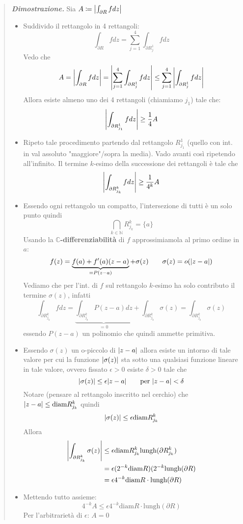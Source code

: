 \documentclass[a4paper,10pt]{article}
\newcommand{\na}{\mathbb{N}} %
\newcommand{\im}{\mathbb{C}} %
\theoremstyle{indentdefinition}
\theoremstyle{indenttheorem}
\theoremstyle{myremark}
\theoremstyle{indentgeneral}
\newenvironment{dimo}{\begin{quote}\textit{\textbf{Dimostrazione.}}}{\end{quote}} %
\begin{document}
\begin{dimo}
    Sia $A\coloneqq\abs{\int_{\partial R}fdz}$
    \begin{itemize}
        \item Suddivido il rettangolo in 4 rettangoli:
        $$\int_{\partial R}fdz=\sum_{j=1}^4\int_{\partial R_j^1}fdz$$
        Vedo che
        $$A=\abs{\int_{\partial R}fdz}=\abs{\sum_{j=1}^4\int_{\partial R_j^1}fdz}\le\sum_{j=1}^4\abs{\int_{\partial R_j^1}fdz}$$
        Allora esiste almeno uno dei 4 rettangoli (chiamiamo $j_1$) tale che:
        $$\abs{\int_{\partial R_{j_1}^1}fdz}\ge \frac{1}{4}A$$
        \item Ripeto tale procedimento partendo dal rettangolo $R_{j_1}^1$ (quello con int. in val assoluto "maggiore"/sopra la media). Vado avanti così ripetendo all'infinito. Il termine $k$-esimo della successione dei rettangoli è tale che 
        $$\abs{\int_{\partial R_{j_k}^k}fdz}\ge \frac{1}{4^k}A$$
        \item Essendo ogni rettangolo un compatto, l'intersezione di tutti è un solo punto quindi
        $$\bigcap_{k\in\na}R_{j_k}^k=\{a\}$$
        Usando la $\im$\textbf{-differenziabilità} di $f$ approssimiamola al primo ordine in $a$: 
        $$f(z)=\underbrace{f(a)+f'(a)(z-a)}_{=P(z-a)}+\sigma(z) \quad \quad \sigma(z)=o(\abs{z-a})$$
        Vediamo che per l'int. di $f$ sul rettangolo $k$-esimo ha solo contributo il termine $\sigma(z)$, infatti
        $$\int_{\partial R_{j_k}^k}fdz=\underbrace{\int_{\partial R_{j_k}^k}P(z-a)dz}_{=0}+\int_{\partial R_{j_k}^k}\sigma(z)=\int_{\partial R_{j_k}^k}\sigma(z)$$
        essendo $P(z-a)$ un polinomio che quindi ammette primitiva.
        \item Essendo $\sigma(z)$ un o-piccolo di $\abs{z-a}$ allora esiste un intorno di tale valore per cui la funzione $\abs{\sigma(z)}$ sta sotto una qualsiasi funzione lineare in tale valore, ovvero fissato $\epsilon>0$ esiste $\delta>0$ tale che
        $$\abs{\sigma(z)}\le\epsilon\abs{z-a} \quad\quad \text{per $\abs{z-a}<\delta$}$$
        Notare (pensare al rettangolo inscritto nel cerchio) che $\abs{z-a}\le\text{diam}R_{j_k}^k$ quindi
        $$\abs{\sigma(z)}\le\epsilon \text{diam}R_{j_k}^k$$
        Allora
        \begin{align*}
            \abs{\int_{\partial R_{j_k}^k}\sigma(z)}&\le \epsilon\text{diam}R_{j_k}^k\text{lungh}(\partial R_{j_k}^k) \\
            &=\epsilon (2^{-k}\text{diam}R)(2^{-k}\text{lungh}(\partial R) \\
            &=\epsilon 4^{-k}\text{diam}R\cdot \text{lungh}(\partial R)
        \end{align*}
        \item Mettendo tutto assieme:
        $$4^{-k}A\le \epsilon 4^{-k}\text{diam}R\cdot \text{lungh}(\partial R)$$
        Per l'arbitrarietà di $\epsilon$: $A=0$
    \end{itemize}
\end{dimo}
\end{document}
